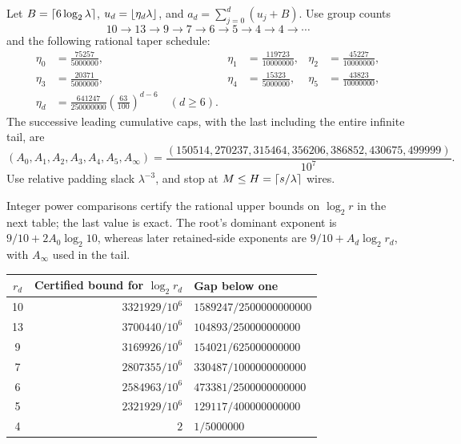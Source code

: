 Let $B=\left\lceil6\log_2\lambda\right\rceil$,
$u_d=\left\lfloor\eta_d\lambda\right\rfloor$, and
$a_d=\sum_{j=0}^d(u_j+B)$. Use group counts
\[
 10\longrightarrow13\longrightarrow9\longrightarrow7
 \longrightarrow6\longrightarrow5\longrightarrow4
 \longrightarrow4\longrightarrow\cdots
\]
and the following rational taper schedule:
\begin{equation}\label{eq:etas}
\begin{aligned}
 \eta_0&=\frac{75257}{5000000},&
 \eta_1&=\frac{119723}{10000000},&
 \eta_2&=\frac{45227}{10000000},\\
 \eta_3&=\frac{20371}{5000000},&
 \eta_4&=\frac{15323}{5000000},&
 \eta_5&=\frac{43823}{10000000},\\
 \eta_d&=\frac{641247}{250000000}
           \left(\frac{63}{100}\right)^{d-6}\quad(d\ge6).
\end{aligned}
\end{equation}
The successive leading cumulative caps, with the last including the
entire infinite tail, are
\begin{equation}\label{eq:caps}
 (A_0,A_1,A_2,A_3,A_4,A_5,A_\infty)
 =\frac{(150514,270237,315464,356206,386852,430675,499999)}{10^7}.
\end{equation}
Use relative padding slack $\lambda^{-3}$, and stop at
$M\le H=\left\lceil s/\lambda\right\rceil$ wires.

Integer power comparisons certify the rational upper bounds on
$\log_2 r$ in the next table; the last value is exact. The root's
dominant exponent is $9/10+2A_0\log_2 10$, whereas later retained-side
exponents are $9/10+A_d\log_2r_d$, with $A_\infty$ used in the tail.

\begin{center}\small
\begin{tabular}{@{}crl@{}}
\toprule $r_d$ & Certified bound for $\log_2r_d$ & Gap below one\\
\midrule
10 &$3321929/10^6$&$1589247/2500000000000$\\
13 &$3700440/10^6$&$104893/250000000000$\\
9  &$3169926/10^6$&$154021/625000000000$\\
7  &$2807355/10^6$&$330487/1000000000000$\\
6  &$2584963/10^6$&$473381/2500000000000$\\
5  &$2321929/10^6$&$129117/400000000000$\\
4  &$2$&$1/5000000$\\
\bottomrule
\end{tabular}
\end{center}

